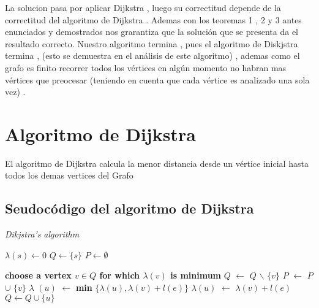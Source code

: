 \documentclass[10pt]{article}
\begin{document}
    \noindent La solucion pasa por aplicar Dijkstra , luego su correctitud depende de la correctitud del algoritmo de Dijkstra . 
    Ademas con los teoremas 1 , 2 y 3  antes enunciados y demostrados nos grarantiza que la soluci\'on que se presenta da el resultado correcto. 
    Nuestro algoritmo termina , pues el algoritmo de Diskjstra termina , (esto se demuestra en el an\'alisis de este algoritmo)  , ademas como el grafo es 
    finito recorrer todos los v\'ertices en alg\'un momento no habran mas v\'ertices que preocesar (teniendo en cuenta que cada v\'ertice es analizado una sola vez)  . 




    \section{Algoritmo de Dijkstra}

    \noindent El algoritmo de Dijkstra calcula la menor distancia desde un v\'ertice inicial hasta todos los demas vertices del Grafo  

    \subsection{Seudoc\'odigo del algoritmo de Dijkstra} 

        \begin{algorithm}[h]
            \caption{\textit{Dikjstra's algorithm}}
            \begin{algorithmic}[1]      
            \State $\lambda \left(s \right) \leftarrow 0 $
            \State $Q \leftarrow \{s\}$
            \State $P \leftarrow \emptyset $

                    \State \textbf{choose a vertex $v \in Q $ for which $\lambda \left(v\right)$ is minimum}
                    \State $Q$ $\leftarrow$ $Q$ $\backslash$ $\{v\}$
                    \State $P$ $\leftarrow$ $P$ $\cup$  $\{v\}$
                            \State $\lambda $ $\left(u\right)$ $\leftarrow $ \textbf{min} $\{ \lambda \left(u\right) , \lambda \left(v\right) + l \left(e\right)\}$ 
                        \Else
                                \State $\lambda\left(u\right)$ $ \leftarrow $ $ \lambda \left(v\right) + l \left(e\right)$
                                \State $ Q \leftarrow  Q \cup \{u\}$
                            \EndIf
                        \EndIf 
                    \EndFor
            \EndWhile 
            \end{algorithmic}
        \end{algorithm}
\end{document}
